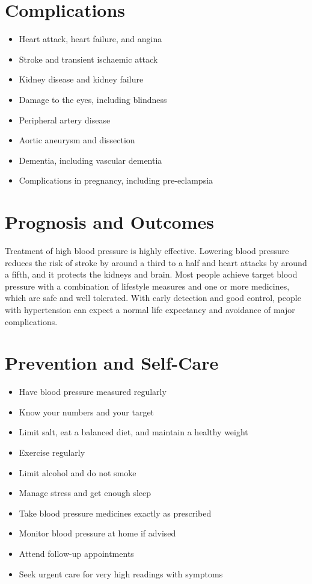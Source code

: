 \section*{Complications}
\begin{itemize}
    \item Heart attack, heart failure, and angina
    \item Stroke and transient ischaemic attack
    \item Kidney disease and kidney failure
    \item Damage to the eyes, including blindness
    \item Peripheral artery disease
    \item Aortic aneurysm and dissection
    \item Dementia, including vascular dementia
    \item Complications in pregnancy, including pre-eclampsia
\end{itemize}

\section*{Prognosis and Outcomes}
Treatment of high blood pressure is highly effective. Lowering blood pressure reduces the risk of stroke by around a third to a half and heart attacks by around a fifth, and it protects the kidneys and brain. Most people achieve target blood pressure with a combination of lifestyle measures and one or more medicines, which are safe and well tolerated. With early detection and good control, people with hypertension can expect a normal life expectancy and avoidance of major complications.

\section*{Prevention and Self-Care}
\begin{itemize}
    \item Have blood pressure measured regularly
    \item Know your numbers and your target
    \item Limit salt, eat a balanced diet, and maintain a healthy weight
    \item Exercise regularly
    \item Limit alcohol and do not smoke
    \item Manage stress and get enough sleep
    \item Take blood pressure medicines exactly as prescribed
    \item Monitor blood pressure at home if advised
    \item Attend follow-up appointments
    \item Seek urgent care for very high readings with symptoms
\end{itemize}

